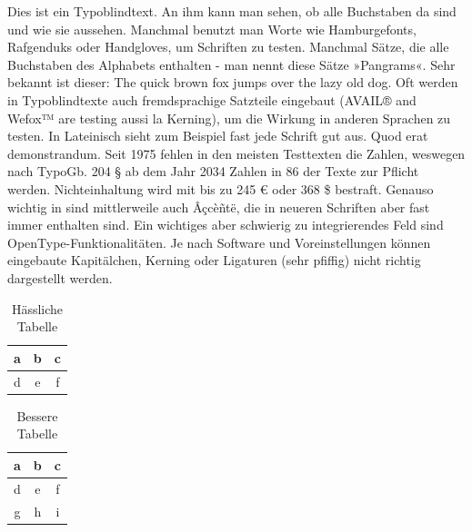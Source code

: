 \documentclass[titlepage]{scrartcl}
\begin{document}
Dies ist ein Typoblindtext. An ihm kann man sehen, ob alle Buchstaben da sind und wie sie aussehen. Manchmal benutzt man Worte wie Hamburgefonts, Rafgenduks oder Handgloves, um Schriften zu testen. Manchmal Sätze, die alle Buchstaben des Alphabets enthalten - man nennt diese Sätze »Pangrams«. Sehr bekannt ist dieser: The quick brown fox jumps over the lazy old dog. Oft werden in Typoblindtexte auch fremdsprachige Satzteile eingebaut (AVAIL® and Wefox™ are testing aussi la Kerning), um die Wirkung in anderen Sprachen zu testen. In Lateinisch sieht zum Beispiel fast jede Schrift gut aus. Quod erat demonstrandum. Seit 1975 fehlen in den meisten Testtexten die Zahlen, weswegen nach TypoGb. 204 § ab dem Jahr 2034 Zahlen in 86 der Texte zur Pflicht werden. Nichteinhaltung wird mit bis zu 245 \euro{} oder 368 \$ bestraft. Genauso wichtig in sind mittlerweile auch Âçcèñtë, die in neueren Schriften aber fast immer enthalten sind. Ein wichtiges aber schwierig zu integrierendes Feld sind OpenType-Funktionalitäten. Je nach Software und Voreinstellungen können eingebaute Kapitälchen, Kerning oder Ligaturen (sehr pfiffig) nicht richtig dargestellt werden.
\begin{table}[htb]
	\caption{Hässliche Tabelle}
	\label{tab:tabelle2}
	\centering
	\begin{tabular}{|c|c|c|}
		\hline
		a & b & c\\
		\hline
		d & e & f\\
		\hline
	\end{tabular}
\end{table}
\begin{table}[htb]
	\caption{Bessere Tabelle}
	\label{tab:tabelle3}
	\centering
	\begin{tabular}{ccc}
		\toprule
		a & b & c\\
		\midrule
		d & e & f\\
		g & h & i\\
		\bottomrule
	\end{tabular}
\end{table}
\end{document}

